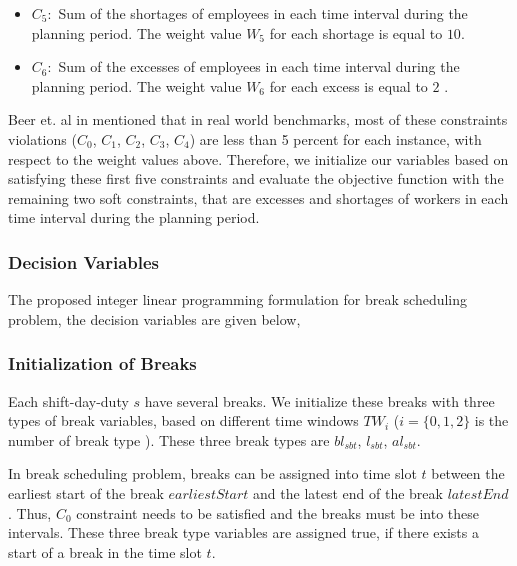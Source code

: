 \begin{itemize}
\begin{itemize}
\item $C_5 : $ Sum of the shortages of employees in each time interval during the planning period. The weight value  $W_5$ for each shortage is equal to $10$. \\

\item $C_6 : $ Sum of the excesses of employees in each time interval during the planning period. The weight value  $W_6$  for each excess is equal to $ 2$ .
\end{itemize}

Beer et. al in \cite{li:2010:beer} mentioned that in real world benchmarks, most of these constraints violations ($C_0$, $C_1$, $C_2$, $C_3$, $C_4$) are less than 5 percent for each instance, with respect to the weight values above. Therefore, we initialize our variables based on satisfying these first five constraints and evaluate the objective function with the remaining two soft constraints, that are excesses and shortages of workers in each time interval during the planning period. \\


\end{itemize}



\subsubsection{Decision Variables}

The proposed integer linear programming formulation for break scheduling problem, the decision variables are given below,

\subsubsection{Initialization of Breaks}

Each shift-day-duty $s$ have several breaks. We initialize these breaks with three types of break variables, based on different time windows $TW_i$ ($i = \{0,1,2 \}$ is the number of break type ). These three break types are $bl_{sbt}$, $l_{sbt}$, $al_{sbt}$.



In break scheduling problem, breaks can be assigned into time slot $t$ between the earliest start of the break $earliestStart$ and the latest end of the break $latestEnd$. Thus, $C_0$ constraint needs to be satisfied and the breaks must be into these intervals. These three break type variables are assigned true, if there exists a start of a break in the time slot $t$. 

